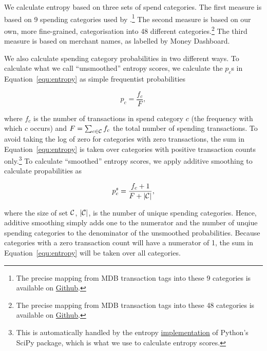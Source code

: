 We calculate entropy based on three sets of spend categories. The first measure
is based on 9 spending categories used by
\citet{muggleton2020evidence}.\footnote{The precise mapping from MDB
    transaction tags into these 9 categories is available on
\href{https://github.com/fabiangunzinger/entropy/blob/7fa9c565bf8959ea92a9d4fe2245da0864e19c27/src/data/txn_classifications.py\#L249}{Github}.}
The second measure is based on our own, more fine-grained, categorisation into
48 different categories.\footnote{The precise mapping from MDB transaction tags
into these 48 categories is available on
\href{https://github.com/fabiangunzinger/entropy/blob/7fa9c565bf8959ea92a9d4fe2245da0864e19c27/src/data/txn_classifications.py\#L503}{Github}.}
The third measure is based on merchant names, as labelled by Money Dashboard.

We also calculate spending category probabilities in two different ways. To
calculate what we call ``unsmoothed'' entropy scores, we calculate the $p_c$s
in Equation~\ref{equ:entropy} as simple frequentist probabilities

\begin{equation}
    p_c = \frac{f_c}{F},
\end{equation}

\noindent where $f_c$ is the number of transactions in spend category $c$ (the
frequency with which $c$ occurs) and $F = \sum_{c \in \mathcal{C}}f_c$ the total
number of spending transactions. To avoid taking the log of zero for categories
with zero transactions, the sum in Equation~\ref{equ:entropy} is taken over
categories with positive transaction counts only.\footnote{This is
    automatically handled by the entropy
    \href{https://docs.scipy.org/doc/scipy/reference/generated/scipy.stats.entropy.html}{implementation}
of Python's SciPy package, which is what we use to calculate entropy scores.}
To calculate ``smoothed'' entropy scores, we apply additive smoothing to
calculate propabilities as

\begin{equation}
    \label{equ:prob_s}
    p_c^{s} = \frac{f_c + 1}{F + |\mathcal{C}|},
\end{equation}

\noindent where the size of set $\mathcal{C}$, $|\mathcal{C}|$, is the number of unique
spending categories. Hence, additive smoothing simply adds one to the numerator
and the number of unqiue spending categories to the denominator of the
unsmoothed probabilities. Because categories with a zero transaction count will
have a numerator of 1, the sum in Equation~\ref{equ:entropy} will be taken over
all categories.

